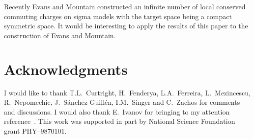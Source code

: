 \documentclass[a4paper,12pt]{article}
\begin{document}
Recently Evans and Mountain \cite{Evans:2000qx} constructed an
infinite number of local conserved commuting charges on sigma models
with the target space being a compact symmetric space.  It would be
interesting to apply the results of this paper to the construction of
Evans and Mountain.

\section*{Acknowledgments}

I would like to thank T.L.~Curtright, H.~Fenderya, L.A.~Ferreira,
L.~Mezincescu, R.~Nepomechie, J.~S\'{a}nchez Guill\'{e}n, I.M.~Singer
and C.~Zachos for comments and discussions.  I would also thank
E.~Ivanov for bringing to my attention reference~\cite{Ivanov:1987yv}. 
This work was supported in part by National Science Foundation grant
PHY--9870101.
\end{document}
